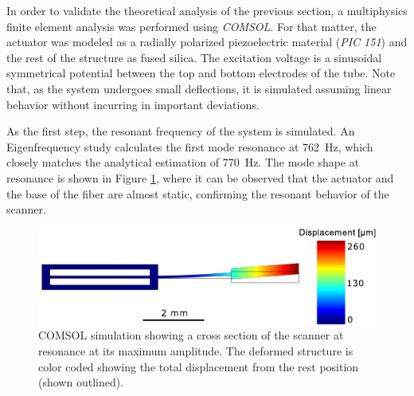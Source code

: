 In order to validate the theoretical analysis of the previous section, a multiphysics finite element analysis was performed using \textit{COMSOL}. For that matter, the actuator was modeled as a radially polarized piezoelectric material (\textit{PIC 151}) and the rest of the structure as fused silica. The excitation voltage is a sinusoidal symmetrical potential between the top and bottom electrodes of the tube. Note that, as the system undergoes small deflections, it is simulated assuming linear behavior \cite{Fertis2006} without incurring in important deviations.

As the first step, the resonant frequency of the system is simulated. An Eigenfrequency study calculates the first mode resonance at \SI{762}{\hertz}, which closely matches the analytical estimation of \SI{770}{\hertz}. The mode shape at resonance is shown in Figure \ref{fig:defle}, where it can be observed that the actuator and the base of the fiber are almost static, confirming the resonant behavior of the scanner.

\begin{figure}[h!]\centering
      \includegraphics[width=10 cm]{figures/30_DesignSimulation/Mechanical/deflection.pdf}
      \caption{COMSOL simulation showing a cross section of the scanner at resonance at its maximum amplitude. The deformed structure is color coded showing the total displacement from the rest position (shown outlined). }
      \label{fig:defle}
\end{figure}


